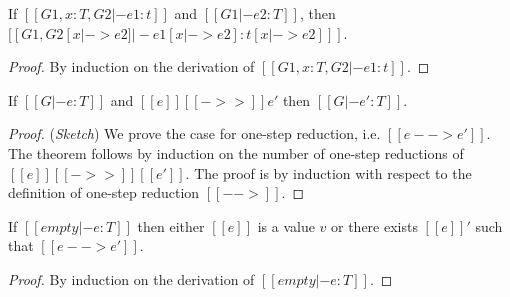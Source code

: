 \begin{lem}[Substitution]\label{lem:ecore:subst}
	If $[[G1, x:T, G2 |- e1:t]]$ and $[[G1 |- e2:T]]$, then $[[G1, G2 [x |-> e2]
|- e1[x |-> e2]  : t[x |-> e2] ]]$.
\end{lem}

\begin{proof}
    By induction on the derivation of $[[G1, x:T, G2 |- e1:t]]$.
\end{proof}

\begin{thm}\label{lem:ecore:reduct}
If $[[G |- e:T]]$ and $[[e]] [[->>]] e'$ then $[[G |- e':T]]$.
\end{thm}

\begin{proof}
    (\emph{Sketch}) We prove the case for one-step reduction, i.e. $[[e -->
e']]$. The theorem follows by induction on the number of one-step reductions
of $[[e]] [[->>]] [[e']]$.
    The proof is by induction with respect to the definition of one-step
reduction $[[-->]]$.
\end{proof}

\begin{thm}[Progress]\label{lem:ecore:prog}
If $[[empty |- e:T]]$ then either $[[e]]$ is a value $v$ or there exists $[[e]]'$
such that $[[e --> e']]$.
\end{thm}

\begin{proof}
    By induction on the derivation of $[[empty |- e:T]]$.
\end{proof}

